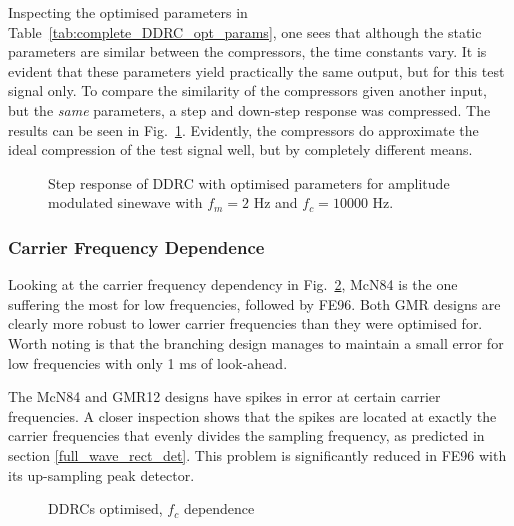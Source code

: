 \documentclass[../main2.tex]{subfiles}
\providecommand{\rootdir}{..}
\begin{document}
Inspecting the optimised parameters in Table~\ref{tab:complete_DDRC_opt_params}, one sees that although the static parameters are similar between the compressors, the time constants vary. It is evident that these parameters  yield practically the same output, but for this test signal only. To compare the similarity of the compressors given another input, but the \emph{same} parameters, a step and down-step response was compressed. The results can be seen in Fig.~\ref{fig:complete_DDRC_opt_step_response}. Evidently, the compressors do approximate the ideal compression of the test signal well, but by completely different means. 
\begin{figure}[h]
\centerline{}
\caption{Step response of DDRC with optimised parameters for amplitude modulated sinewave with $f_m=2$ Hz and $f_c=10000$ Hz.}
\label{fig:complete_DDRC_opt_step_response}
\end{figure}

\subsubsection{Carrier Frequency Dependence}
Looking at the carrier frequency dependency in Fig.~\ref{fig:complete_DDRC_opt_fc_dep}, McN84 is the one suffering the most for low frequencies, followed by FE96. Both GMR designs are clearly more robust to lower carrier frequencies than they were optimised for. Worth noting is that the branching design manages to maintain a small error for low frequencies with only 1 ms of look-ahead. 

The McN84 and GMR12 designs have spikes in error at certain carrier frequencies. A closer inspection shows that the spikes are located at exactly the carrier frequencies that evenly divides the sampling frequency, as predicted in section \ref{full_wave_rect_det}. This problem is significantly reduced in FE96 with its up-sampling peak detector.

\begin{figure}[h]
\centerline{}
\caption{DDRCs optimised, $f_c$ dependence}
\label{fig:complete_DDRC_opt_fc_dep}
\end{figure}
\end{document}
